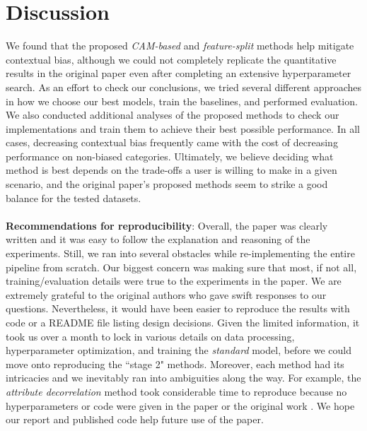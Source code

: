 \section{Discussion}

We found that the proposed \emph{CAM-based} and \emph{feature-split} methods help mitigate contextual bias, although we could not completely replicate the quantitative results in the original paper even after completing an extensive hyperparameter search. As an effort to check our conclusions, we tried several different approaches in how we choose our best models, train the baselines, and performed evaluation. We also conducted additional analyses of the proposed methods to check our implementations and train them to achieve their best possible performance. In all cases, decreasing contextual bias frequently came with the cost of decreasing performance on non-biased categories. Ultimately, we believe deciding what method is best depends on the trade-offs a user is willing to make in a given scenario, and the original paper's proposed methods seem to strike a good balance for the tested datasets.\\
\\
\textbf{Recommendations for reproducibility}: Overall, the paper was clearly written and it was easy to follow the explanation and reasoning of the experiments. Still, we ran into several obstacles while re-implementing the entire pipeline from scratch. Our biggest concern was making sure that most, if not all, training/evaluation details were true to the experiments in the paper. We are extremely grateful to the original authors who gave swift responses to our questions. Nevertheless, it would have been easier to reproduce the results with code or a README file listing design decisions. Given the limited information, it took us over a month to lock in various details on data processing, hyperparameter optimization, and training the \emph{standard} model, before we could move onto reproducing the ``stage 2" methods. Moreover, each method had its intricacies and we inevitably ran into ambiguities along the way. For example, the \textit{attribute decorrelation} method took considerable time to reproduce because no hyperparameters or code were given in the paper or the original work \cite{Jayaraman_2014_CVPR}. We hope our report and published code help future use of the paper.\\
\\
